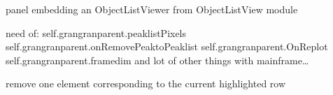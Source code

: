 \documentclass[letterpaper,10pt,english]{sphinxmanual}
\begin{document}
\begin{fulllineitems}
\label{\detokenize{PeakSearchGUI:LaueTools.GUI.PeakSearchGUI.PeakListOLV}}
panel embedding an ObjectListViewer from ObjectListView module

need of:
self.grangranparent.peaklistPixels
self.grangranparent.onRemovePeaktoPeaklist
self.grangranparent.OnReplot
self.grangranparent.framedim
and lot of other things with mainframe…

\begin{fulllineitems}
\label{\detokenize{PeakSearchGUI:LaueTools.GUI.PeakSearchGUI.PeakListOLV.OnRemove}}
remove one element corresponding to the current highlighted row

\end{fulllineitems}


\end{fulllineitems}

\end{document}
